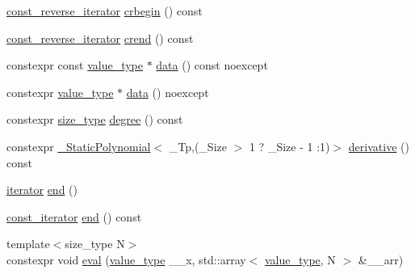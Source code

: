 \begin{DoxyCompactItemize}
\hyperlink{class____gnu__cxx_1_1__StaticPolynomial_ae59b7bc5bdf7c61e562e8c4c8eaf904d}{const\+\_\+reverse\+\_\+iterator} \hyperlink{class____gnu__cxx_1_1__StaticPolynomial_a2960cc96c78bf8b1b532d8d2a870ec63}{crbegin} () const
\item 
\hyperlink{class____gnu__cxx_1_1__StaticPolynomial_ae59b7bc5bdf7c61e562e8c4c8eaf904d}{const\+\_\+reverse\+\_\+iterator} \hyperlink{class____gnu__cxx_1_1__StaticPolynomial_acb1591941949826c5cf6633b8df8ef55}{crend} () const
\item 
constexpr const \hyperlink{class____gnu__cxx_1_1__StaticPolynomial_aad5f3d6d5876b6926b30724aeac649d6}{value\+\_\+type} $\ast$ \hyperlink{class____gnu__cxx_1_1__StaticPolynomial_a5dfe81eb78faeacfc8ea3fbe195139de}{data} () const noexcept
\item 
constexpr \hyperlink{class____gnu__cxx_1_1__StaticPolynomial_aad5f3d6d5876b6926b30724aeac649d6}{value\+\_\+type} $\ast$ \hyperlink{class____gnu__cxx_1_1__StaticPolynomial_afa52c120f0daf872a8ab0c5c2757781f}{data} () noexcept
\item 
constexpr \hyperlink{class____gnu__cxx_1_1__StaticPolynomial_a0cc0aa4adab35686ef2474e07f511ff9}{size\+\_\+type} \hyperlink{class____gnu__cxx_1_1__StaticPolynomial_a5977dac3a84e8a43f3e9da28b62ca46a}{degree} () const
\item 
constexpr \hyperlink{class____gnu__cxx_1_1__StaticPolynomial}{\+\_\+\+Static\+Polynomial}$<$ \+\_\+\+Tp,(\+\_\+\+Size $>$ 1 ? \+\_\+\+Size -\/ 1 \+:1)$>$ \hyperlink{class____gnu__cxx_1_1__StaticPolynomial_a1180d204a1aa8603293ec5b9c6f514b3}{derivative} () const
\item 
\hyperlink{class____gnu__cxx_1_1__StaticPolynomial_af042e6cdb307879fbfe357c13a843c7c}{iterator} \hyperlink{class____gnu__cxx_1_1__StaticPolynomial_aa927727967fb2b7224742a31df4af1ff}{end} ()
\item 
\hyperlink{class____gnu__cxx_1_1__StaticPolynomial_a2e806a3a61788a2fad49adf67725ae7e}{const\+\_\+iterator} \hyperlink{class____gnu__cxx_1_1__StaticPolynomial_a3f97ba2b07743090c16217a5bc61fb77}{end} () const
\item 
{\footnotesize template$<$size\+\_\+type N$>$ }\\constexpr void \hyperlink{class____gnu__cxx_1_1__StaticPolynomial_a515532d18a28290cf869b3394c93f558}{eval} (\hyperlink{class____gnu__cxx_1_1__StaticPolynomial_aad5f3d6d5876b6926b30724aeac649d6}{value\+\_\+type} \+\_\+\+\_\+x, std\+::array$<$ \hyperlink{class____gnu__cxx_1_1__StaticPolynomial_aad5f3d6d5876b6926b30724aeac649d6}{value\+\_\+type}, N $>$ \&\+\_\+\+\_\+arr)

\end{DoxyCompactItemize}
